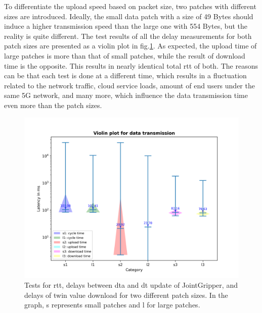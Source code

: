 To differentiate the upload speed based on packet size, two patches with 
different sizes are introduced. Ideally, the small data patch with a size of 
49 Bytes should induce a higher transmission speed than the large one with 554 Bytes, 
but the reality is quite different. The test results of all the 
delay measurements for both patch sizes are presented as a violin plot in 
fig.\ref{fig: UD-violin-patchsize}. As expected, the upload time of large 
patches is more than that of small patches, while the result of download time is 
the opposite. This results in nearly identical total \gls{rtt} of both. 
The reasons can be that each test is done at a different time, which results in a 
fluctuation related to the network traffic, cloud service loads, amount of end users 
under the same 5G network, and many more, which influence the data transmission time 
even more than the patch sizes.

\begin{figure}[htb]
    \includegraphics[width=\textwidth]{figures/tests/DT/violin_patch_size.png}
    \centering
    \caption{Tests for \gls{rtt}, delays between \gls{dta} and \gls{dt} 
    update of JointGripper, and delays of twin value download for 
    two different patch sizes. In the graph, s represents small patches 
    and l for large patches.\label{fig: UD-violin-patchsize}}
\end{figure}

